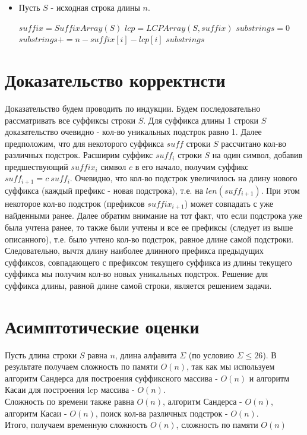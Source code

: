 \documentclass[12pt]{article}
\begin{document}
\begin{itemize}

\item Пусть $S$ - исходная строка длины $n$.
\begin{algorithmic}[1]	
		\State $suffix = SuffixArray(S)$
		\State $lcp = LCPArray(S, suffix)$
		\State $substrings = 0$
			\State $substrings += n - suffix[i]- lcp[i]$
		\EndFor	
		\State \Return $substrings$
	\EndProcedure
\end{algorithmic}	
	

	
\end{itemize}
	



\section{Доказательство корректнсти}
Доказательство будем проводить по индукции. Будем последовательно рассматривать все суффиксы строки $S$. Для суффикса длины 1 строки  $S$ доказательство очевидно - кол-во уникальных подстрок равно 1. Далее предположим, что для некоторого суффикса $suff$ строки $S$ рассчитано кол-во различных подстрок. Расширим суффикс $suff_{i}$ строки $S$ на один символ, добавив предшествующий $suffix_{i}$ символ $c$ в его начало, получим суффикс $suff_{i+1} = c\ suff_{i}$. Очевидно, что кол-во подстрок увеличилось на длину нового суффикса (каждый префикс - новая подстрока), т.е. на $len(suff_{i+1})$. При этом некоторое кол-во подстрок (префиксов $suffix_{i+1}$) может совпадать с уже найденными ранее. Далее обратим внимание на тот факт, что если подстрока уже была учтена ранее, то также были учтены и все ее префиксы (следует из выше описанного), т.е. было учтено кол-во подстрок, равное длине самой подстроки. Следовательно, вычтя длину наиболее длинного префикса предыдущих суффиксов, совпадающего с префиксом текущего суффикса из длины текущего суффикса мы получим кол-во новых уникальных подстрок. Решение для суффикса длины, равной длине самой строки, является решением задачи.




\section{Асимптотические оценки}
Пусть длина строки $S$ равна $n$, длина алфавита $\Sigma$ (по условию $\Sigma \leq 26$). В результате получаем сложность по памяти $O(n)$, так как мы используем алгоритм Сандерса для построения суффиксного массива - $O(n)$ и алгоритм Касаи для построения lcp массива - $O(n)$.\\

Сложность по времени также равна $O(n)$, алгоритм Сандерса - $O(n)$, алгоритм Касаи  - $O(n)$, поиск кол-ва различных подстрок - $O(n)$.\\
Итого, получаем временную сложность $O(n)$, сложность по памяти $O(n)$
\end{document}
